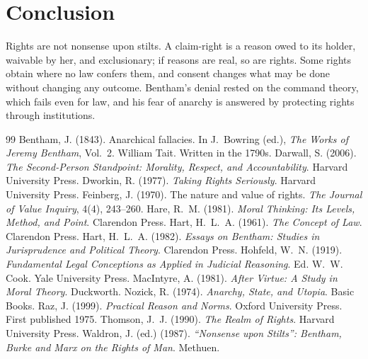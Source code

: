 \documentclass{situationist-preprint}
\begin{document}
\section{Conclusion}

Rights are not nonsense upon stilts. A claim-right is a reason owed to its holder, waivable by her, and exclusionary; if reasons are real, so are rights. Some rights obtain where no law confers them, and consent changes what may be done without changing any outcome. Bentham's denial rested on the command theory, which fails even for law, and his fear of anarchy is answered by protecting rights through institutions.

\begin{thebibliography}{99}\small
{} Bentham, J. (1843). Anarchical fallacies. In J.~Bowring (ed.), \emph{The Works of Jeremy Bentham}, Vol.~2. William Tait. Written in the 1790s.
 Darwall, S. (2006). \emph{The Second-Person Standpoint: Morality, Respect, and Accountability}. Harvard University Press.
 Dworkin, R. (1977). \emph{Taking Rights Seriously}. Harvard University Press.
 Feinberg, J. (1970). The nature and value of rights. \emph{The Journal of Value Inquiry}, 4(4), 243--260.
 Hare, R.~M. (1981). \emph{Moral Thinking: Its Levels, Method, and Point}. Clarendon Press.
 Hart, H.~L.~A. (1961). \emph{The Concept of Law}. Clarendon Press.
 Hart, H.~L.~A. (1982). \emph{Essays on Bentham: Studies in Jurisprudence and Political Theory}. Clarendon Press.
 Hohfeld, W.~N. (1919). \emph{Fundamental Legal Conceptions as Applied in Judicial Reasoning}. Ed. W.~W. Cook. Yale University Press.
 MacIntyre, A. (1981). \emph{After Virtue: A Study in Moral Theory}. Duckworth.
 Nozick, R. (1974). \emph{Anarchy, State, and Utopia}. Basic Books.
 Raz, J. (1999). \emph{Practical Reason and Norms}. Oxford University Press. First published 1975.
 Thomson, J.~J. (1990). \emph{The Realm of Rights}. Harvard University Press.
 Waldron, J. (ed.) (1987). \emph{\enquote{Nonsense upon Stilts}: Bentham, Burke and Marx on the Rights of Man}. Methuen.
\end{thebibliography}
\end{document}
